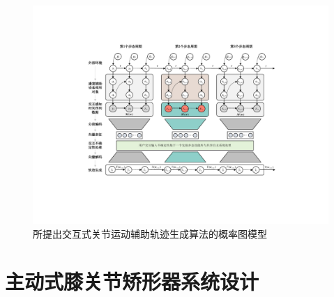 \begin{figure}[htb]
  \centering\includegraphics[width=1\textwidth]{figures/5-Fig-Intro.pdf}
  \caption{所提出交互式关节运动辅助轨迹生成算法的概率图模型}
  \label{fig:5-Intro}
\end{figure}

\section{主动式膝关节矫形器系统设计}

